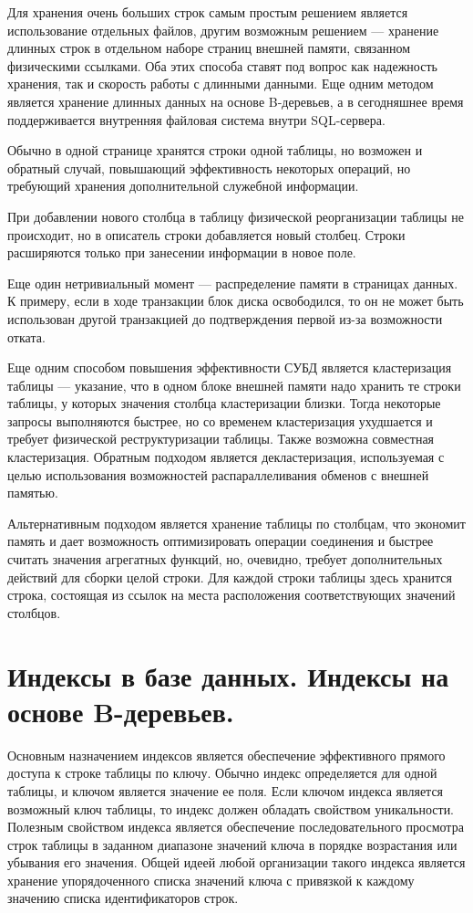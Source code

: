 \documentclass[a4paper,12pt]{article}
\begin{document}
Для хранения очень больших строк самым простым решением является использование
отдельных файлов, другим возможным решением — хранение длинных строк в отдельном
наборе страниц внешней памяти, связанном физическими ссылками. Оба этих способа ставят
под вопрос как надежность хранения, так и скорость работы с длинными данными. Еще
одним методом является хранение длинных данных на основе B-деревьев, а в сегодняшнее
время поддерживается внутренняя файловая система внутри SQL-сервера.

Обычно в одной странице хранятся строки одной таблицы, но возможен и обратный случай,
повышающий эффективность некоторых операций, но требующий хранения дополнительной
служебной информации.

При добавлении нового столбца в таблицу физической реорганизации таблицы не
происходит, но в описатель строки добавляется новый столбец. Строки расширяются только
при занесении информации в новое поле.

Еще один нетривиальный момент — распределение памяти в страницах данных. К примеру,
если в ходе транзакции блок диска освободился, то он не может быть использован другой
транзакцией до подтверждения первой из-за возможности отката.

Еще одним способом повышения эффективности СУБД является кластеризация таблицы —
указание, что в одном блоке внешней памяти надо хранить те строки таблицы, у которых
значения столбца кластеризации близки. Тогда некоторые запросы выполняются быстрее, но
со временем кластеризация ухудшается и требует физической реструктуризации таблицы.
Также возможна совместная кластеризация. Обратным подходом является декластеризация,
используемая с целью использования возможностей распараллеливания обменов с внешней
памятью.

Альтернативным подходом является хранение таблицы по столбцам, что экономит память и
дает возможность оптимизировать операции соединения и быстрее считать значения
агрегатных функций, но, очевидно, требует дополнительных действий для сборки целой
строки. Для каждой строки таблицы здесь хранится строка, состоящая из ссылок на места
расположения соответствующих значений столбцов.

\section{Индексы в базе данных. Индексы на основе B-деревьев.}
Основным назначением индексов является обеспечение эффективного прямого доступа к
строке таблицы по ключу. Обычно индекс определяется для одной таблицы, и ключом
является значение ее поля. Если ключом индекса является возможный ключ таблицы, то
индекс должен обладать свойством уникальности. Полезным свойством индекса является
обеспечение последовательного просмотра строк таблицы в заданном диапазоне значений
ключа в порядке возрастания или убывания его значения. Общей идеей любой организации
такого индекса является хранение упорядоченного списка значений ключа с привязкой к
каждому значению списка идентификаторов строк.
\end{document}
